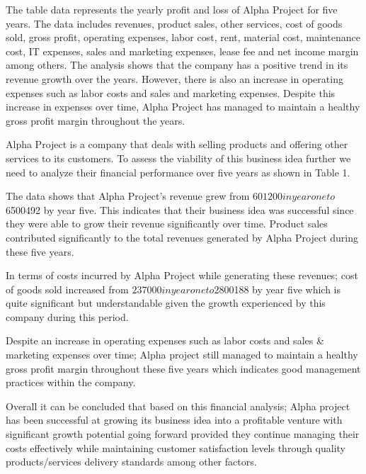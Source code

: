 The table data represents the yearly profit and loss of Alpha Project for five years. The data includes revenues, product sales, other services, cost of goods sold, gross profit, operating expenses, labor cost, rent, material cost, maintenance cost, IT expenses, sales and marketing expenses, lease fee and net income margin among others. The analysis shows that the company has a positive trend in its revenue growth over the years. However, there is also an increase in operating expenses such as labor costs and sales and marketing expenses. Despite this increase in expenses over time, Alpha Project has managed to maintain a healthy gross profit margin throughout the years.

Alpha Project is a company that deals with selling products and offering other services to its customers. To assess the viability of this business idea further we need to analyze their financial performance over five years as shown in Table 1.

The data shows that Alpha Project's revenue grew from $601200 in year one to $6500492 by year five. This indicates that their business idea was successful since they were able to grow their revenue significantly over time. Product sales contributed significantly to the total revenues generated by Alpha Project during these five years.

In terms of costs incurred by Alpha Project while generating these revenues; cost of goods sold increased from $237000 in year one to $2800188 by year five which is quite significant but understandable given the growth experienced by this company during this period.

Despite an increase in operating expenses such as labor costs and sales & marketing expenses over time; Alpha project still managed to maintain a healthy gross profit margin throughout these five years which indicates good management practices within the company.

Overall it can be concluded that based on this financial analysis; Alpha project has been successful at growing its business idea into a profitable venture with significant growth potential going forward provided they continue managing their costs effectively while maintaining customer satisfaction levels through quality products/services delivery standards among other factors.